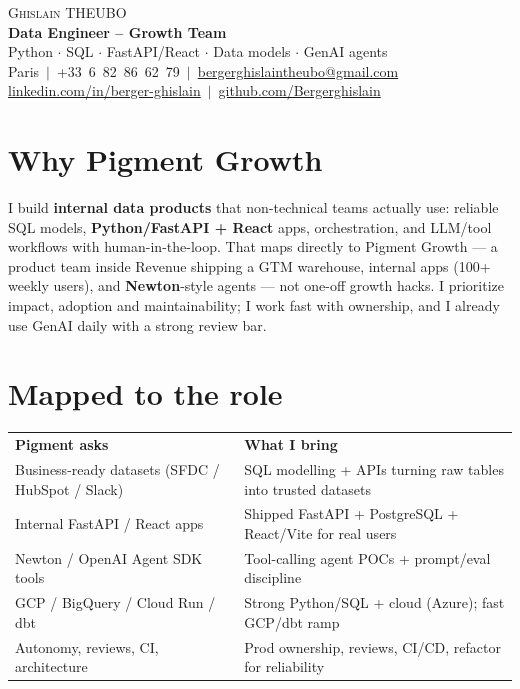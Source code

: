 \documentclass[letterpaper,10.5pt]{article}
\begin{document}
\begin{center}
  {\Huge \scshape Ghislain THEUBO} \\[3pt]
  \textbf{Data Engineer -- Growth Team} \\[2pt]
  \small Python $\cdot$ SQL $\cdot$ FastAPI/React $\cdot$ Data models $\cdot$ GenAI agents \\[3pt]
  \small Paris $\,|\,$ +33~6~82~86~62~79 $\,|\,$
  \href{mailto:bergerghislaintheubo@gmail.com}{bergerghislaintheubo@gmail.com} \\[1pt]
  \href{https://www.linkedin.com/in/berger-ghislain}{linkedin.com/in/berger-ghislain} $\,|\,$
  \href{https://github.com/Bergerghislain}{github.com/Bergerghislain}
\end{center}

\section{Why Pigment Growth}
\small{
I build \textbf{internal data products} that non-technical teams actually use: reliable SQL models, \textbf{Python/FastAPI + React} apps,
orchestration, and LLM/tool workflows with human-in-the-loop. That maps directly to Pigment Growth --- a product team inside Revenue
shipping a GTM warehouse, internal apps (100+ weekly users), and \textbf{Newton}-style agents --- not one-off growth hacks.
I prioritize impact, adoption and maintainability; I work fast with ownership, and I already use GenAI daily with a strong review bar.
}

\section{Mapped to the role}
\small{
\begin{tabular*}{0.97\textwidth}{@{}p{}@{\extracolsep{\fill}}p{}@{}}
\textbf{Pigment asks} & \textbf{What I bring} \\
Business-ready datasets (SFDC / HubSpot / Slack) & SQL modelling + APIs turning raw tables into trusted datasets \\
Internal FastAPI / React apps & Shipped FastAPI + PostgreSQL + React/Vite for real users \\
Newton / OpenAI Agent SDK tools & Tool-calling agent POCs + prompt/eval discipline \\
GCP / BigQuery / Cloud Run / dbt & Strong Python/SQL + cloud (Azure); fast GCP/dbt ramp \\
Autonomy, reviews, CI, architecture & Prod ownership, reviews, CI/CD, refactor for reliability \\
\end{tabular*}
}
\end{document}
